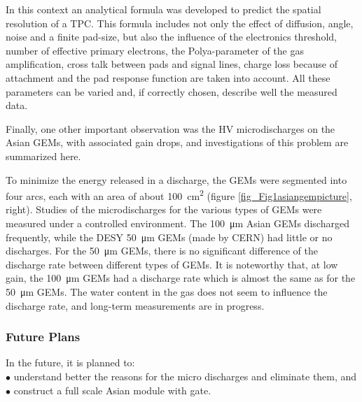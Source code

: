 In this context an analytical formula was developed to predict the spatial resolution of a TPC. This formula includes
not only the effect of diffusion, angle,
noise and a finite pad-size, but also the influence of the electronics threshold, number of effective primary electrons,
the Polya-parameter of the gas
amplification, cross talk between pads and signal lines, charge loss because of attachment and the pad response function
are taken into account. All
these parameters can be varied and, if correctly chosen, describe well the measured data.

Finally, one other important observation was the HV microdischarges on the Asian GEMs, with associated gain drops,
and investigations of this problem are summarized here.

To minimize the energy released in a discharge, the GEMs were segmented into four arcs, each with an area of
about \SI{100}{\centi\meter\squared} (figure \ref{fig_Fig1asiangempicture}, right).
Studies of the microdischarges for the various types of GEMs were measured under a controlled environment.
The \SI{100}{\micro\meter} Asian GEMs discharged frequently, while the DESY \SI{50}{\micro\meter} GEMs (made by CERN) had little or no
discharges. For the \SI{50}{\micro\meter} GEMs, there is no significant difference of
the discharge rate between different types of GEMs. It is noteworthy that, at low gain, the \SI{100}{\micro\meter} GEMs
had a discharge rate which is almost the same as for the \SI{50}{\micro\meter} GEMs. The water content in the gas does not seem to
influence the
discharge rate, and long-term measurements are in progress.


\subsubsection{Future Plans}

In the future, it is planned to:\\
$\bullet$ understand better the reasons for the micro discharges and eliminate them, and \\
$\bullet$ construct a full scale Asian module with gate.
